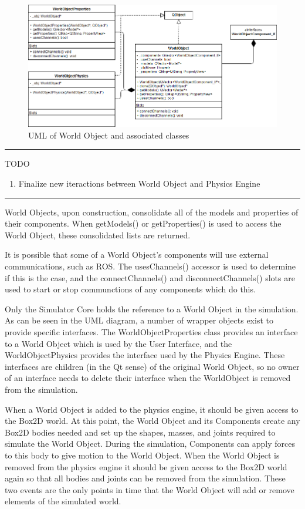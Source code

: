  \begin{figure}[h]
 	\begin{center}
 	\includegraphics[scale=0.5]{./images_design/uml/WorldObj}
 	\caption{UML of World Object and associated classes\label{uml:worldobj}}
 	\end{center}
 \end{figure}
 \hrule	
	TODO
	\begin{enumerate}
		\item Finalize new iteractions between World Object and Physics Engine
	\end{enumerate}
\hrule
	World Objects, upon construction, consolidate all of the models and properties of their components. When getModels() or getProperties() is used to access the World Object, these consolidated lists are returned.
	
	It is possible that some of a World Object's components will use external communications, such as ROS. The usesChannels() accessor is used to determine if this is the case, and the connectChannels() and disconnectChannels() slots are used to start or stop communctions of any components which do this.
	
	Only the Simulator Core holds the reference to a World Object in the simulation. As can be seen in the UML diagram, a number of wrapper objects exist to provide specific interfaces. The WorldObjectProperties class provides an interface to a World Object which is used by the User Interface, and the WorldObjectPhysics provides the interface used by the Physics Engine. These interfaces are children (in the Qt sense) of the original World Object, so no owner of an interface needs to delete their interface when the WorldObject is removed from the simulation.
	
	When a World Object is added to the physics engine, it should be given access to the Box2D world. At this point, the World Object and its Components create any Box2D bodies needed and set up the shapes, masses, and joints required to simulate the World Object. During the simulation, Components can apply forces to this body to give motion to the World Object. When the World Object is removed from the physics engine it should be given access to the Box2D world again so that all bodies and joints can be removed from the simulation. These two events are the only points in time that the World Object will add or remove elements of the simulated world.
  
